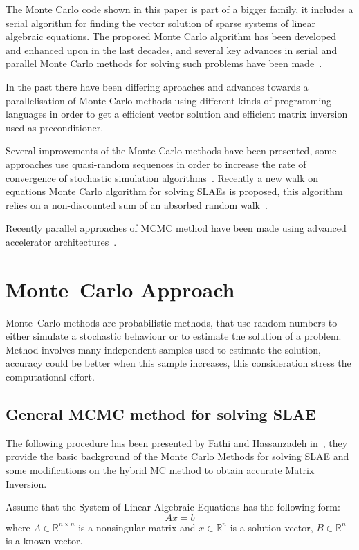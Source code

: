 \documentclass{juliacon}
\begin{document}
The Monte Carlo code shown in this paper is part of a bigger family, it includes a serial algorithm for finding the vector solution of sparse systems of linear algebraic equations. The proposed Monte Carlo algorithm has been developed and enhanced upon in the last decades, and several key advances in serial and parallel Monte Carlo methods for solving such problems have been made~\cite{Alexandrov2005, alexandrov1999parallel, Branford2008grid, Dimov1998convergent, Dimov2007,
Fathi2002mixedmc}.

In the past there have been differing aproaches and advances towards a parallelisation of Monte Carlo methods using different kinds of programming languages in order to get a efficient vector solution and efficient matrix inversion used as preconditioner.

Several improvements of the Monte Carlo methods have been presented, some approaches use quasi-random sequences in order to  increase the rate of convergence of stochastic simulation algorithms~\cite{Atanassov2018, alexandrov2018}. Recently a new walk on equations Monte Carlo algorithm for solving SLAEs is proposed, this algorithm relies on a non-discounted  sum of an absorbed random walk~\cite{dimov2015}. 

Recently parallel approaches of MCMC method have been made using advanced accelerator architectures~\cite{lebedev2018}. 


\section{Monte~Carlo Approach}
\label{section_algorithm}

Monte~Carlo methods are probabilistic methods, that use random numbers to either simulate a stochastic behaviour or to estimate the solution of a problem. Method involves many independent samples used to estimate the solution, accuracy could be better when this sample increases, this consideration stress the computational effort. 

\subsection{General MCMC method for solving SLAE}
The following procedure has been presented by Fathi and Hassanzadeh in~\cite{Fathi-Vajargah2018}, they provide the basic background of the Monte Carlo Methods for solving SLAE and some modifications on the hybrid MC method to obtain accurate Matrix Inversion.

Assume that the System of Linear Algebraic Equations has the following form:
\begin{equation}
\label{slae-1}
Ax = b 
\end{equation}
where $A \in \mathbb{R}^{n \times n}$ is a nonsingular matrix and $x \in \mathbb{R}^n$ is a solution vector, $B \in \mathbb{R}^n$ is a known vector.
\end{document}
